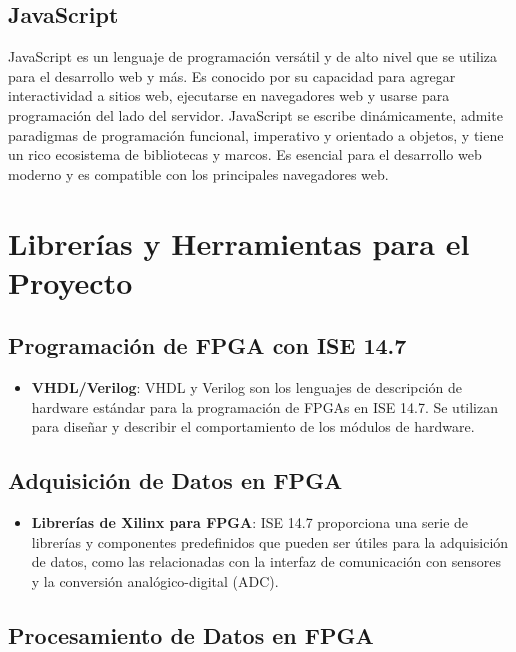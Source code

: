 \documentclass[osajnl,twocolumn,showpacs,superscriptaddress,10pt]{revtex4-1}
\begin{document}
\subsection{JavaScript}

JavaScript es un lenguaje de programación versátil y de alto nivel que se utiliza para el desarrollo web y más. Es conocido por su capacidad para agregar interactividad a sitios web, ejecutarse en navegadores web y usarse para programación del lado del servidor. JavaScript se escribe dinámicamente, admite paradigmas de programación funcional, imperativo y orientado a objetos, y tiene un rico ecosistema de bibliotecas y marcos. Es esencial para el desarrollo web moderno y es compatible con los principales navegadores web.
\\

\section*{Librerías y Herramientas para el Proyecto}

\subsection*{Programación de FPGA con ISE 14.7}

\begin{itemize}
    \item \textbf{VHDL/Verilog}: VHDL y Verilog son los lenguajes de descripción de hardware estándar para la programación de FPGAs en ISE 14.7. Se utilizan para diseñar y describir el comportamiento de los módulos de hardware.
\end{itemize}

\subsection*{Adquisición de Datos en FPGA}

\begin{itemize}
  \item \textbf{Librerías de Xilinx para FPGA}: ISE 14.7 proporciona una serie de librerías y componentes predefinidos que pueden ser útiles para la adquisición de datos, como las relacionadas con la interfaz de comunicación con sensores y la conversión analógico-digital (ADC).
\end{itemize}

\subsection*{Procesamiento de Datos en FPGA}
\end{document}
